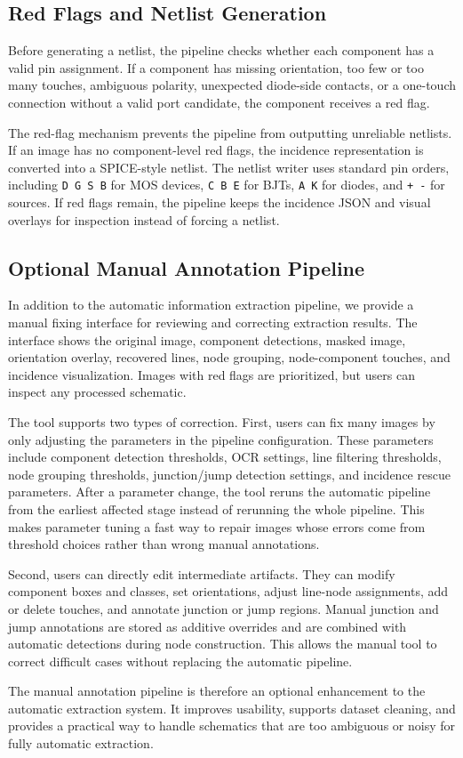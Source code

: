 \subsection{Red Flags and Netlist Generation}
\label{subsec:red-flags-output}

Before generating a netlist, the pipeline checks whether each component has a valid pin assignment. If a component has missing orientation, too few or too many touches, ambiguous polarity, unexpected diode-side contacts, or a one-touch connection without a valid port candidate, the component receives a red flag.

The red-flag mechanism prevents the pipeline from outputting unreliable netlists. If an image has no component-level red flags, the incidence representation is converted into a SPICE-style netlist. The netlist writer uses standard pin orders, including \texttt{D G S B} for MOS devices, \texttt{C B E} for BJTs, \texttt{A K} for diodes, and \texttt{+ -} for sources. If red flags remain, the pipeline keeps the incidence JSON and visual overlays for inspection instead of forcing a netlist.

\subsection{Optional Manual Annotation Pipeline}
\label{subsec:manual-annotation}

In addition to the automatic information extraction pipeline, we provide a manual fixing interface for reviewing and correcting extraction results. The interface shows the original image, component detections, masked image, orientation overlay, recovered lines, node grouping, node-component touches, and incidence visualization. Images with red flags are prioritized, but users can inspect any processed schematic.

The tool supports two types of correction. First, users can fix many images by only adjusting the parameters in the pipeline configuration. These parameters include component detection thresholds, OCR settings, line filtering thresholds, node grouping thresholds, junction/jump detection settings, and incidence rescue parameters. After a parameter change, the tool reruns the automatic pipeline from the earliest affected stage instead of rerunning the whole pipeline. This makes parameter tuning a fast way to repair images whose errors come from threshold choices rather than wrong manual annotations.

Second, users can directly edit intermediate artifacts. They can modify component boxes and classes, set orientations, adjust line-node assignments, add or delete touches, and annotate junction or jump regions. Manual junction and jump annotations are stored as additive overrides and are combined with automatic detections during node construction. This allows the manual tool to correct difficult cases without replacing the automatic pipeline.

The manual annotation pipeline is therefore an optional enhancement to the automatic extraction system. It improves usability, supports dataset cleaning, and provides a practical way to handle schematics that are too ambiguous or noisy for fully automatic extraction.
